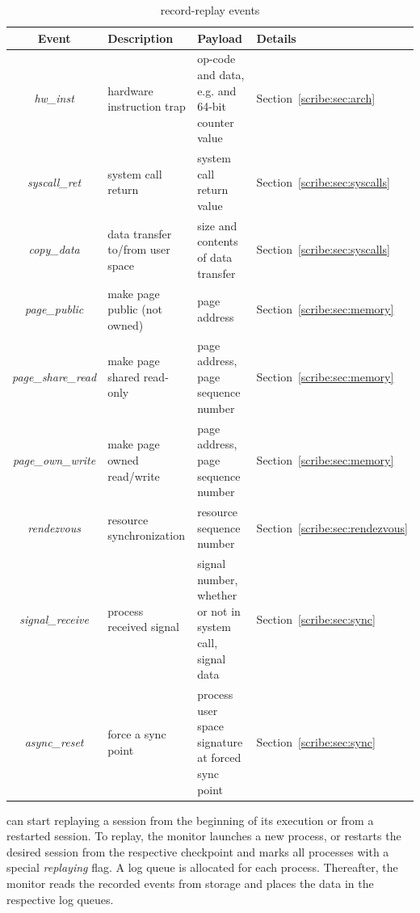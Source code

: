 \begin{table}[t]
\small
\begin{center}
\begin{tabular}{|c|l|l|l|}
  \hline\hline
  {\bf Event} & {\bf Description} & {\bf Payload} & {\bf Details} \\
  \hline
  {\em hw\_inst} & hardware instruction trap &
	op-code and data, e.g. \code{RDTSC} and 64-bit
	counter value 
	& Section~\ref{scribe:sec:arch} \\
  \hline
  {\em syscall\_ret} & system call return &
	system call return value
	& Section~\ref{scribe:sec:syscalls} \\
  \hline
  {\em copy\_data} & data transfer to/from user space &
	size and contents of data transfer
	& Section~\ref{scribe:sec:syscalls} \\
  \hline
  {\em page\_public} & make page public (not owned) &
	page address
	& Section~\ref{scribe:sec:memory} \\
  \hline
  {\em page\_share\_read} & make page shared read-only &
	page address, page sequence number
	& Section~\ref{scribe:sec:memory} \\
  \hline
  {\em page\_own\_write} & make page owned read/write &
	page address, page sequence number
	& Section~\ref{scribe:sec:memory} \\
  \hline
  {\em rendezvous} & resource synchronization &
	 resource sequence number
	& Section~\ref{scribe:sec:rendezvous} \\
  \hline
  {\em signal\_receive} & process received signal &
	signal number, whether or not in system call,
	signal data
	& Section~\ref{scribe:sec:sync} \\
  \hline
  {\em async\_reset} & force a sync point &
	process user space signature at forced sync point
	& Section~\ref{scribe:sec:sync} \\
  \hline
  \hline
\end{tabular}
\end{center}
\vskip -5mm
\caption{\scribe{} record-replay events}
\label{scribe:tab:events}
\vskip -1mm
\end{table}

\scribe{} can start replaying a session from the beginning of its
execution or from a restarted session.  To replay, the
monitor launches a new process, or restarts the desired session from
the respective checkpoint and marks all processes with a special
{\em replaying} flag.  A log queue is allocated for each process.
Thereafter, the monitor reads the recorded events from
storage and places the data in the respective log queues. 
 
